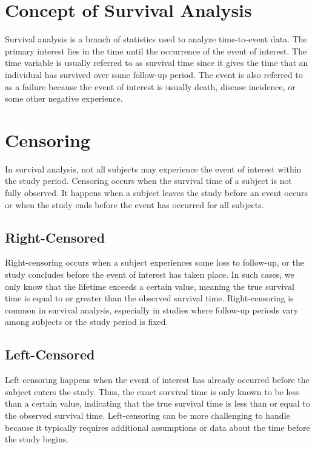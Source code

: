 \documentclass[doublespacing,12pt]{report}
\begin{document}
\section{Concept of Survival Analysis}

Survival analysis is a branch of statistics used to analyze time-to-event data. The primary interest lies in the time until the occurrence of the event of interest.  The time variable is usually referred to as survival time since it gives the time that an individual has survived over some follow-up period. The event is also referred to as a failure because the event of interest is usually death, disease incidence, or some other negative experience. 


\section{Censoring}

In survival analysis, not all subjects may experience the event of interest within the study period. Censoring occurs when the survival time of a subject is not fully observed. It happens when a subject leaves the study before an event occurs or when the study ends before the event has occurred for all subjects.

\subsection{Right-Censored}

Right-censoring occurs when a subject experiences some loss to follow-up, or the study concludes before the event of interest has taken place. In such cases, we only know that the lifetime exceeds a certain value, meaning the true survival time is equal to or greater than the observed survival time. Right-censoring is common in survival analysis, especially in studies where follow-up periods vary among subjects or the study period is fixed.

\subsection{Left-Censored}

Left censoring happens when the event of interest has already occurred before the subject enters the study. Thus, the exact survival time is only known to be less than a certain value, indicating that the true survival time is less than or equal to the observed survival time. Left-censoring can be more challenging to handle because it typically requires additional assumptions or data about the time before the study begins.
\end{document}
